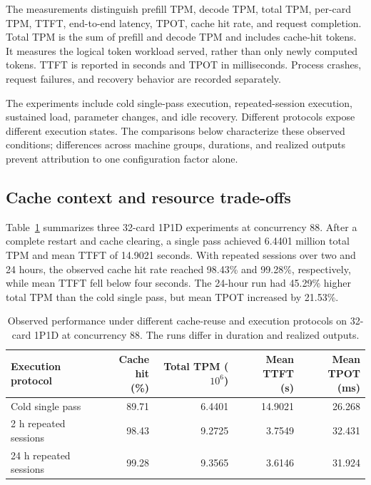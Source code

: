 \documentclass[11pt,a4paper]{article}
\begin{document}
The measurements distinguish prefill TPM, decode TPM, total TPM, per-card TPM, TTFT, end-to-end latency, TPOT, cache hit rate, and request completion. Total TPM is the sum of prefill and decode TPM and includes cache-hit tokens. It measures the logical token workload served, rather than only newly computed tokens. TTFT is reported in seconds and TPOT in milliseconds. Process crashes, request failures, and recovery behavior are recorded separately.

The experiments include cold single-pass execution, repeated-session execution, sustained load, parameter changes, and idle recovery. Different protocols expose different execution states. The comparisons below characterize these observed conditions; differences across machine groups, durations, and realized outputs prevent attribution to one configuration factor alone.

\subsection{Cache context and resource trade-offs}
Table~\ref{tab:historical-cache} summarizes three 32-card 1P1D experiments at concurrency 88. After a complete restart and cache clearing, a single pass achieved 6.4401 million total TPM and mean TTFT of 14.9021 seconds. With repeated sessions over two and 24 hours, the observed cache hit rate reached 98.43\% and 99.28\%, respectively, while mean TTFT fell below four seconds. The 24-hour run had 45.29\% higher total TPM than the cold single pass, but mean TPOT increased by 21.53\%.

\begin{table}[htbp]
\centering\small
\begin{tabular}{@{}lrrrr@{}}
\toprule
Execution protocol & \shortstack{Cache hit\\(\%)} & \shortstack{Total TPM\\($10^6$)} & \shortstack{Mean TTFT\\(s)} & \shortstack{Mean TPOT\\(ms)} \\
\midrule
Cold single pass & 89.71 & 6.4401 & 14.9021 & 26.268 \\
2 h repeated sessions & 98.43 & 9.2725 & 3.7549 & 32.431 \\
24 h repeated sessions & 99.28 & 9.3565 & 3.6146 & 31.924 \\
\bottomrule
\end{tabular}
\caption{Observed performance under different cache-reuse and execution protocols on 32-card 1P1D at concurrency 88. The runs differ in duration and realized outputs.}
\label{tab:historical-cache}
\end{table}
\end{document}
